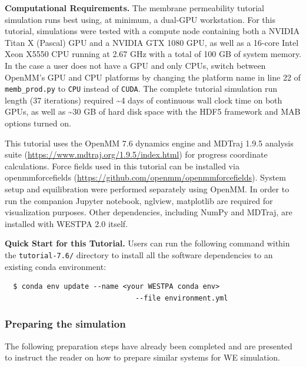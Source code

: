 \textbf{Computational Requirements.} The membrane permeability tutorial simulation runs best using, at minimum, a dual-GPU workstation. 
For this tutorial, simulations were tested with a compute node containing both a NVIDIA Titan X (Pascal) GPU and a NVIDIA GTX 1080 GPU, as well as a 16-core Intel Xeon X5550 CPU running at 2.67 GHz with a total of 100 GB of system memory. 
In the case a user does not have a GPU and only CPUs, switch between OpenMM's GPU and CPU platforms by changing the platform name in line 22 of \verb|memb_prod.py| to \verb|CPU| instead of \verb|CUDA|. 
The complete tutorial simulation run length (37 iterations) required \textasciitilde4 days of continuous wall clock time on both GPUs, as well as \textasciitilde30 GB of hard disk space with the HDF5 framework and MAB options turned on.

This tutorial uses the OpenMM 7.6 dynamics engine \citep{eastman_openmm_2017} and MDTraj 1.9.5 analysis suite ({\url{https://www.mdtraj.org/1.9.5/index.html}}) for progress coordinate calculations. 
Force fields used in this tutorial can be installed via openmmforcefields ({\url{https://github.com/openmm/openmmforcefields}}). 
System setup and equilibration were performed separately using OpenMM. 
In order to run the companion Jupyter notebook, nglview, matplotlib are required for visualization purposes. 
Other dependencies, including NumPy and MDTraj, are installed with WESTPA 2.0 itself.

\textbf{Quick Start for this Tutorial.} Users can run the following command within the \verb|tutorial-7.6/| directory to install all the software dependencies to an existing conda environment:

\begin{verbatim}
  $ conda env update --name <your WESTPA conda env> 
                               --file environment.yml
\end{verbatim}
\pagebreak

\subsubsection{Preparing the simulation}
The following preparation steps have already been completed and are presented to instruct the reader on how to prepare similar systems for WE simulation.

